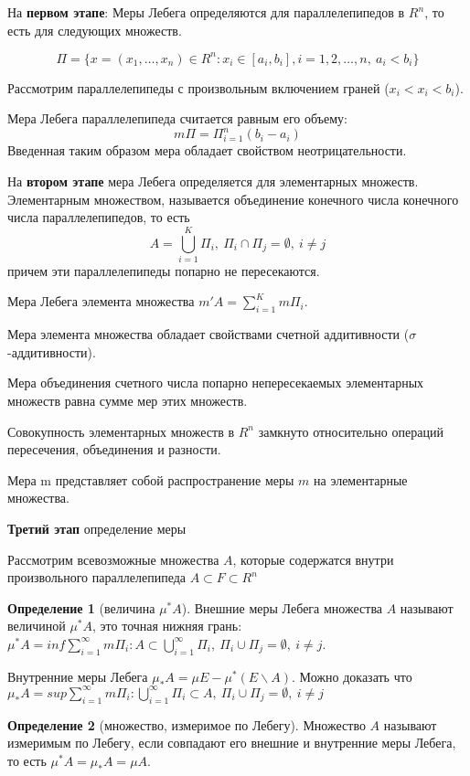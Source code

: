 \documentclass[14pt,a4paper]{extarticle}
\theoremstyle{definition}
\newtheorem{definition}{Определение}[section]
\theoremstyle{remark}
\renewcommand{\[}{\begin{dmath*}[compact]}
\renewcommand{\]}{\end{dmath*}}
\newcommand{\sep}{ , \ \allowbreak }
\begin{document}
На \textbf{первом этапе}: Меры Лебега определяются для параллелепипедов в $R^n$,
то есть для следующих множеств.

\[\Pi = \{x=(x_1,\dots,x_n)\in R^n: x_i\in [a_i,b_i], i=1,2,\dots,n\sep
a_i<b_i\}\]

Рассмотрим параллелепипеды с произвольным включением граней ($x_i<x_i<b_i$).

Мера Лебега параллелепипеда считается равным его объему:
\[m\Pi = \Pi_{i=1}^n(b_i-a_i)\]
Введенная таким образом мера обладает свойством неотрицательности.

На \textbf{втором этапе} мера Лебега определяется для элементарных множеств.
Элементарным множеством, называется объединение конечного числа конечного
числа параллелепипедов, то есть
\[A=\bigcup _{i=1}^K \Pi_i\sep\Pi_i \cap \Pi_j = \emptyset \sep i\neq j\]
причем эти параллелепипеды попарно не пересекаются.

Мера Лебега элемента множества $m'A=\sum_{i=1}^Km\Pi_i$.

Мера элемента множества обладает свойствами счетной аддитивности
($\sigma$-аддитивности).

Мера объединения счетного числа попарно непересекаемых элементарных множеств
равна сумме мер этих множеств.

Совокупность элементарных множеств в $R^n$ замкнуто относительно операций
пересечения, объединения и разности.

Мера m представляет собой распространение меры $m$ на элементарные множества.

\textbf{Третий этап} определение меры

Рассмотрим всевозможные множества $A$, которые содержатся внутри
произвольного параллелепипеда $A\subset F \subset R^n$

\begin{definition}[величина {$\mu^*A$}]
  Внешние меры Лебега множества $A$ называют величиной $\mu^*A$,
  это точная нижняя грань:
  $\mu^*A=inf\sum_{i=1}^\infty m\Pi_i: A\subset\bigcup _{i=1}^\infty\Pi_i\sep
  \Pi_i\cup\Pi_j=\emptyset\sep i\neq j$.
\end{definition}

Внутренние меры Лебега $\mu_*A=\mu E-\mu^*(E\backslash A)$.
Можно доказать что
$\mu_*A=sup\sum_{i=1}^\infty m\Pi_i: \bigcup _{i=1}^\infty\Pi_i \subset A \sep
\Pi_i\cup\Pi_j=\emptyset\sep i\neq j$

\begin{definition}[множество, измеримое по Лебегу]
  Множество $A$ называют измеримым по Лебегу, если совпадают его внешние и
  внутренние меры Лебега, то есть $\mu^*A=\mu_*A=\mu A$.
\end{definition}
\end{document}
